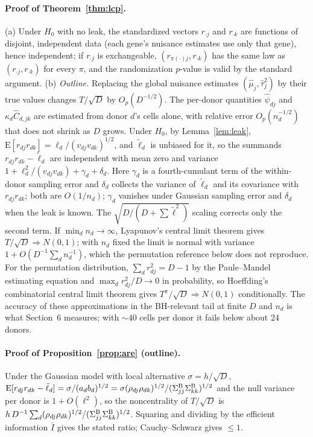 \paragraph{Proof of Theorem~\ref{thm:lcp}.}
(a) Under $H_0$ with no leak, the standardized vectors $r_{\cdot j}$ and $r_{\cdot k}$ are functions of disjoint, independent data (each gene's nuisance estimates use only that gene), hence independent; if $r_{\cdot j}$ is exchangeable, $(r_{\pi(\cdot)j},r_{\cdot k})$ has the same law as $(r_{\cdot j},r_{\cdot k})$ for every $\pi$, and the randomization $p$-value is valid by the standard argument. (b) \emph{Outline.} Replacing the global nuisance estimates $(\hat\mu_j,\hat\tau^2_j)$ by their true values changes $T/\sqrt D$ by $O_p(D^{-1/2})$. The per-donor quantities $\hat\psi_{dj}$ and $\kappa_d\hat C_{d,jk}$ are estimated from donor $d$'s cells alone, with relative error $O_p(n_d^{-1/2})$ that does not shrink as $D$ grows. Under $H_0$, by Lemma~\ref{lem:leak}, $\mathrm{E}[r_{dj}r_{dk}]=\ell_d/(v_{dj}v_{dk})^{1/2}$, and $\tilde\ell_d$ is unbiased for it, so the summands $r_{dj}r_{dk}-\tilde\ell_d$ are independent with mean zero and variance $1+\ell_d^2/(v_{dj}v_{dk})+\gamma_d+\delta_d$. Here $\gamma_d$ is a fourth-cumulant term of the within-donor sampling error and $\delta_d$ collects the variance of $\tilde\ell_d$ and its covariance with $r_{dj}r_{dk}$; both are $O(1/n_d)$; $\gamma_d$ vanishes under Gaussian sampling error and $\delta_d$ when the leak is known. The $\sqrt{D/(D+\sum\tilde\ell^2)}$ scaling corrects only the second term. If $\min_dn_d\to\infty$, Lyapunov's central limit theorem gives $T/\sqrt D\Rightarrow N(0,1)$; with $n_d$ fixed the limit is normal with variance $1+O(D^{-1}\sum_dn_d^{-1})$, which the permutation reference below does not reproduce. For the permutation distribution, $\sum_dr_{dj}^2=D-1$ by the Paule--Mandel estimating equation and $\max_dr_{dj}^2/D\to0$ in probability, so Hoeffding's combinatorial central limit theorem \citep{Hoeffding1951} gives $T^\pi/\sqrt D\Rightarrow N(0,1)$ conditionally. The accuracy of these approximations in the BH-relevant tail at finite $D$ and $n_d$ is what Section~6 measures; with ${\sim}40$ cells per donor it fails below about 24 donors.

\paragraph{Proof of Proposition~\ref{prop:are} (outline).}
Under the Gaussian model with local alternative $\sigma=h/\sqrt D$, $\mathrm{E}[r_{dj}r_{dk}-\tilde\ell_d]=\sigma/(a_db_d)^{1/2}=\sigma(\rho_{dj}\rho_{dk})^{1/2}/(\Sigma^{\mathrm{B}}_{jj}\Sigma^{\mathrm{B}}_{kk})^{1/2}$ and the null variance per donor is $1+O(\ell^2)$, so the noncentrality of $T/\sqrt D$ is $h\,D^{-1}\sum_d(\rho_{dj}\rho_{dk})^{1/2}/(\Sigma^{\mathrm{B}}_{jj}\Sigma^{\mathrm{B}}_{kk})^{1/2}$. Squaring and dividing by the efficient information $\bar I$ gives the stated ratio; Cauchy--Schwarz gives $\le1$.

